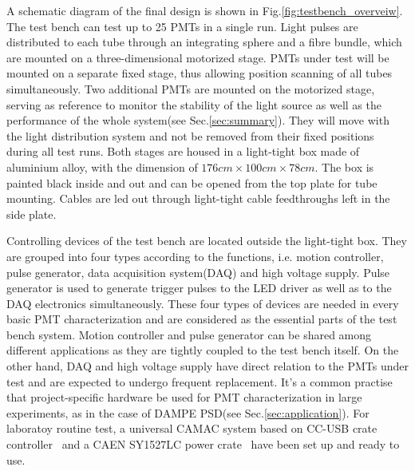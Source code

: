 \documentclass[review,number,sort&compress]{elsarticle}
\begin{document}
A schematic diagram of the final design is shown in Fig.\ref{fig:testbench_overveiw}.
The test bench can test up to 25 PMTs in a single run.
Light pulses are distributed to each tube through an integrating sphere and a fibre bundle, which are mounted on a three-dimensional motorized stage.
PMTs under test will be mounted on a separate fixed stage, thus allowing position scanning of all tubes simultaneously.
Two additional PMTs are mounted on the motorized stage, serving as reference to monitor the stability of the light source as well as the performance of the whole system(see Sec.\ref{sec:summary}).
They will move with the light distribution system and not be removed from their fixed positions during all test runs. 
Both stages are housed in a light-tight box made of aluminium alloy, with the dimension of $176cm\times100cm\times78cm$.
The box is painted black inside and out and can be opened from the top plate for tube mounting.
Cables are led out through light-tight cable feedthroughs left in the side plate.

Controlling devices of the test bench are located outside the light-tight box.
They are grouped into four types according to the functions, i.e. motion controller, pulse generator, data acquisition system(DAQ) and high voltage supply.
Pulse generator is used to generate trigger pulses to the LED driver as well as to the DAQ electronics simultaneously.
These four types of devices are needed in every basic PMT characterization and are considered as the essential parts of the test bench system.
Motion controller and pulse generator can be shared among different applications as they are tightly coupled to the test bench itself.
On the other hand, DAQ and high voltage supply have direct relation to the PMTs under test and are expected to undergo frequent replacement.
It's a common practise that project-specific hardware be used for PMT characterization in large experiments, as in the case of DAMPE PSD(see Sec.\ref{sec:application}).
For laboratoy routine test, a universal CAMAC system based on CC-USB crate controller~\cite{cc_usb} and a CAEN SY1527LC power crate~\cite{sy1527lc} have been set up and ready to use.
\end{document}
